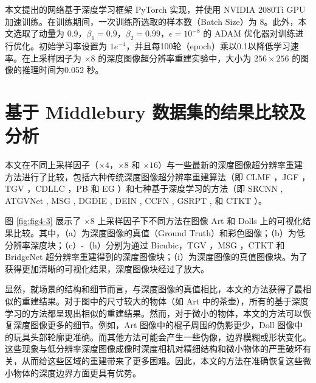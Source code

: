 本文提出的网络基于深度学习框架 PyTorch 实现，并使用 NVIDIA 2080Ti GPU 加速训练。在训练期间，一次训练所选取的样本数（Batch Size）为 8。此外，本文选取了动量为 0.9，$\beta_1=0.9$，$\beta_2=0.99$，$\epsilon={10}^{-8}$ 的 ADAM 优化器对训练进行优化。初始学习率设置为 $1e^{-4}$，并且每100轮（epoch）乘以0.1以降低学习速率。在上采样因子为 $\times 8$ 的深度图像超分辨率重建实验中，大小为 $256 \times 256$ 的图像的推理时间为0.052 秒。

\section{基于 Middlebury 数据集的结果比较及分析}

本文在不同上采样因子（$\times 4$，$\times 8$ 和 $\times 16$）与一些最新的深度图像超分辨率重建方法进行了比较，包括六种传统深度图像超分辨率重建算法（即 CLMF \cite{LuSMLD12}，JGF \cite{0001TT13}，TGV \cite{DBLP:conf/iccv/FerstlRRRB13}，CDLLC \cite{DBLP:conf/icmcs/XieCFS14}，PB \cite{DBLP:conf/eccv/AodhaCNB12} 和 EG \cite{DBLP:journals/tip/XieFS16}）和七种基于深度学习的方法（即 SRCNN \cite{DBLP:conf/eccv/DongLHT14}, ATGVNet \cite{DBLP:conf/eccv/RieglerRB16}, MSG \cite{HuiLT16}, DGDIE \cite{DBLP:conf/cvpr/GuZGCCZ17}, DEIN \cite{DBLP:conf/icassp/YeDL18}, CCFN \cite{WenSLLF19}, GSRPT \cite{LutioDWS19}, 和 CTKT \cite{Sun2021cvpr}）。

图 \ref{fig:fig4-3} 展示了 $\times 8$ 上采样因子下不同方法在图像 Art 和 Dolls 上的可视化结果比较。其中，（a）为深度图像的真值（Ground Truth）和彩色图像；（b）为低分辨率深度块；（c）-（h）分别为通过 Bicubic，TGV \cite{DBLP:conf/iccv/FerstlRRRB13}，MSG \cite{HuiLT16}，CTKT \cite{Sun2021cvpr} 和 BridgeNet 超分辨率重建得到的深度图像块；（i）为深度图像的真值图像块。为了获得更加清晰的可视化结果，深度图像块经过了放大。

\newpage
显然，就场景的结构和细节而言，与深度图像的真值相比，本文的方法获得了最相似的重建结果。对于图中的尺寸较大的物体（如 Art 中的茶壶），所有的基于深度学习的方法都呈现出相似的重建结果。然而，对于微小的物体，本文的方法可以恢复深度图像更多的细节。例如，Art 图像中的棍子周围的伪影更少，Doll 图像中的玩具头部轮廓更准确。而其他方法可能会产生一些伪像，边界模糊或形状变化。这些现象与低分辨率深度图像成像时深度相机对精细结构和微小物体的严重破坏有关，从而给这些区域的重建带来了更多困难。因此，本文的方法在准确恢复这些微小物体的深度边界方面更具有优势。

